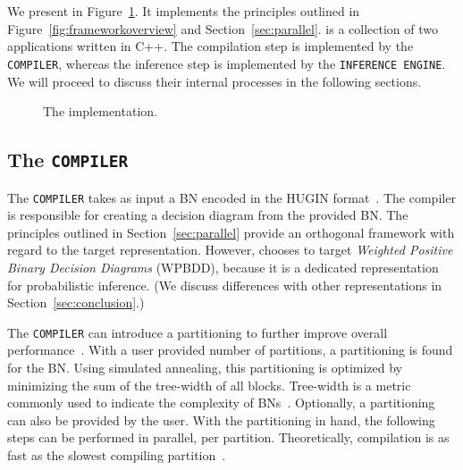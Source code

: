 \section{\toolname}
\label{sec:tool}

We present \toolname in Figure~\ref{fig:implementation}. It implements the principles outlined in Figure~\ref{fig:frameworkoverview} and Section~\ref{sec:parallel}. \toolname is a collection of two applications written in C++. The compilation step is implemented by the \verb+COMPILER+, whereas the inference step is implemented by the \verb+INFERENCE ENGINE+. We will proceed to discuss their internal processes in the following sections.

\begin{figure}[!t]
    \centering
    
    \caption{The implementation.}
    \label{fig:implementation}
\end{figure}

\subsection{The \texttt{COMPILER}}

The \verb+COMPILER+ takes as input a BN encoded in the HUGIN format~\cite{madsen2003hugin}. The compiler is responsible for creating a decision diagram from the provided BN. The principles outlined in Section~\ref{sec:parallel} provide an orthogonal framework with regard to the target representation. However, \toolname chooses to target \emph{Weighted Positive Binary Decision Diagrams} (WPBDD), because it is a dedicated representation for probabilistic inference. (We discuss differences with other representations in Section~\ref{sec:conclusion}.)

The \texttt{COMPILER} can introduce a partitioning to further improve overall performance~\cite{dal2017reducing}. With a user provided number of partitions, a partitioning is found for the BN. Using simulated annealing, this partitioning is optimized by minimizing the sum of the  tree-width of all blocks. Tree-width is a metric commonly used to indicate the complexity of BNs~\cite{bollig2014width}. Optionally, a partitioning can also be provided by the user. With the partitioning in hand, the following steps can be performed in parallel, per partition. Theoretically, compilation is as fast as the slowest compiling partition~\cite{dal2018parallel}.

